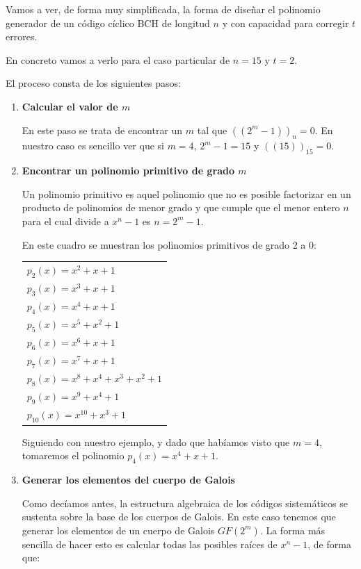 \documentclass[es,apuntes]{uah}
\begin{document}
{Vamos a ver, de forma muy simplificada, la forma de diseñar el polinomio generador de un código cíclico BCH de longitud $n$ y con capacidad para corregir $t$ errores. 

En concreto vamos a verlo para el caso particular de $n=15$ y $t=2$.

El proceso consta de los siguientes pasos:

\begin{enumerate}
	\item {\bf Calcular el valor de $m$}
	
	En este paso se trata de encontrar un $m$ tal que $((2^m-1))_n = 0$.
	En nuestro caso es sencillo ver que si $m=4$, $2^m-1 = 15$ y $((15))_{15} = 0$.	
	
	\item {\bf Encontrar un polinomio primitivo de grado $m$}
	
	Un polinomio primitivo es aquel polinomio que no es posible factorizar en un producto de polinomios de menor grado y que cumple que el menor entero $n$ para el cual divide a $x^n -1$ es $n=2^m -1$.
	
	En este cuadro se muestran los polinomios primitivos de grado 2 a 0:
	
\begin{center}
\begin{tabular}{l}
\hline
	$p_{2}(x) = x^2+x+1$ \\
	$p_{3}(x) = x^3+x+1$ \\
	$p_{4}(x) = x^4+x+1$ \\
	$p_{5}(x) = x^5+x^2+1$ \\
	$p_{6}(x) = x^6+x+1$ \\
	$p_{7}(x) = x^7+x+1$ \\
	$p_{8}(x) = x^8+x^4+x^3+x^2+1$ \\
	$p_{9}(x) = x^9+x^4+1$ \\
	$p_{10}(x) = x^{10}+x^3+1$ \\
\hline
\end{tabular}
\end{center}
	
	Siguiendo con nuestro ejemplo, y dado que habíamos visto que $m=4$, tomaremos el polinomio $p_4(x)=x^4+x+1$.
	
	\item {\bf Generar los elementos del cuerpo de Galois}
	 
	 Como decíamos antes, la estructura algebraica de los códigos sistemáticos se sustenta sobre la base de los cuerpos de Galois. En este caso tenemos que generar los elementos de un cuerpo de Galois $GF(2^m)$. La forma más sencilla de hacer esto es calcular todas las posibles raíces de $x^n -1$, de forma que:
	 

\end{enumerate}}
\end{document}
